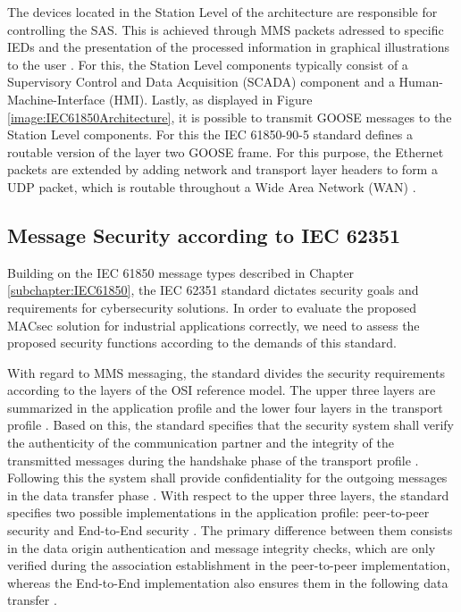 \documentclass[conference, onecolumn, a4paper]{IEEEtran}
\begin{document}
\smallskip
The devices located in the Station Level of the architecture are responsible for controlling the SAS. This is achieved through MMS packets adressed 
to specific IEDs and the presentation of the processed information in graphical illustrations to the user \cite{SGRWin_IEC61850Architecture:2021}. 
For this, the Station Level components typically consist of a Supervisory Control and Data Acquisition (SCADA) component and a Human-Machine-Interface 
(HMI). Lastly, as displayed in Figure \ref{image:IEC61850Architecture}, it is possible to transmit GOOSE messages to the Station Level components. 
For this the IEC 61850-90-5 standard \cite{IEC61850-90-5:2012} defines a routable version of the layer two GOOSE frame. For this purpose, the Ethernet 
packets are extended by adding network and transport layer headers to form a UDP packet, which is routable throughout a Wide Area Network (WAN) 
\cite{routable_GOOSE_SV:2020}.

\subsection{Message Security according to IEC 62351}
\noindent Building on the IEC 61850 message types described in Chapter \ref{subchapter:IEC61850}, the IEC 62351 standard \cite{IEC62351:2024} dictates 
security goals and requirements for cybersecurity solutions. In order to evaluate the proposed MACsec solution for industrial applications correctly, 
we need to assess the proposed security functions according to the demands of this standard.

\smallskip
With regard to MMS messaging, the standard divides the security requirements according to the layers of the OSI reference model. The upper three layers 
are summarized in the application profile and the lower four layers in the transport profile \cite{SecureMMS:2020}. Based on this, the standard specifies 
that the security system shall verify the authenticity of the communication partner and the integrity of the transmitted messages during the handshake 
phase of the transport profile \cite{Review_IEC62351:2019}. Following this the system shall provide confidentiality for the outgoing messages in the 
data transfer phase \cite{SecureMMS:2020}. With respect to the upper three layers, the standard specifies two possible implementations in the application 
profile: peer-to-peer security and End-to-End security \cite{Review_IEC62351:2019}. The primary difference between them consists in the data origin 
authentication and message integrity checks, which are only verified during the association establishment in the peer-to-peer implementation, whereas 
the End-to-End implementation also ensures them in the following data transfer \cite{Review_IEC62351:2019}.
\end{document}
